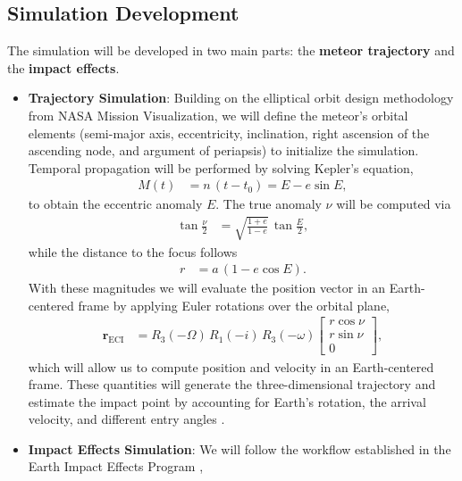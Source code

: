\documentclass[conference]{IEEEtran}
\begin{document}
\subsection{Simulation Development}
The simulation will be developed in two main parts: the \textbf{meteor
	trajectory} and the \textbf{impact effects}.
\begin{itemize}
	\item \textbf{Trajectory Simulation}: Building on the elliptical orbit design
	      methodology from NASA Mission Visualization, we will define the meteor's
	      orbital elements (semi-major axis, eccentricity, inclination, right
	      ascension of the ascending node, and argument of periapsis) to initialize
	      the simulation. Temporal propagation will be performed by solving Kepler's
	      equation,
	      \begin{align}
		      M(t) & = n\,(t - t_0) = E - e \sin E, \label{eq:kepler}
	      \end{align}
	      to obtain the eccentric anomaly $E$. The true anomaly $\nu$ will be
	      computed via
	      \begin{align}
		      \tan\frac{\nu}{2} & = \sqrt{\frac{1 + e}{1 - e}}\,\tan\frac{E}{2},
	      \end{align}
	      while the distance to the focus follows
	      \begin{align}
		      r & = a\,(1 - e \cos E).
	      \end{align}
	      With these magnitudes we will evaluate the position vector in an
	      Earth-centered frame by applying Euler rotations over the orbital plane,
	      \begin{align}
		      \mathbf{r}_{\text{ECI}} & =
		      R_3(-\Omega)\,R_1(-i)\,R_3(-\omega)
		      \begin{bmatrix}
			      r \cos \nu \\
			      r \sin \nu \\
			      0
		      \end{bmatrix},
	      \end{align}
	      which will allow us to compute position and velocity in an Earth-centered
	      frame. These quantities will generate the three-dimensional trajectory and
	      estimate the impact point by accounting for Earth's rotation, the arrival
	      velocity, and different entry angles \cite{nasaEllipticalOrbit}.
	\item \textbf{Impact Effects Simulation}: We will follow the workflow
	      established in the Earth Impact Effects Program \cite{collins2005},

\end{itemize}
\end{document}
